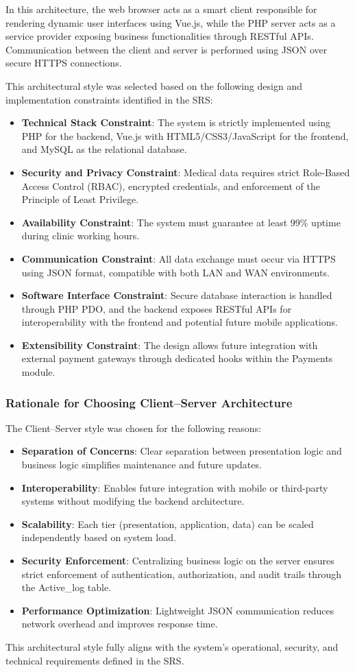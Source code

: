 In this architecture, the web browser acts as a smart client responsible for rendering dynamic user interfaces using Vue.js, while the PHP server acts as a service provider exposing business functionalities through RESTful APIs. Communication between the client and server is performed using JSON over secure HTTPS connections.

This architectural style was selected based on the following design and implementation constraints identified in the SRS:

\begin{itemize}
	\item \textbf{Technical Stack Constraint}: The system is strictly implemented using PHP for the backend, Vue.js with HTML5/CSS3/JavaScript for the frontend, and MySQL as the relational database.
	\item \textbf{Security and Privacy Constraint}: Medical data requires strict Role-Based Access Control (RBAC), encrypted credentials, and enforcement of the Principle of Least Privilege.
	\item \textbf{Availability Constraint}: The system must guarantee at least 99\% uptime during clinic working hours.
	\item \textbf{Communication Constraint}: All data exchange must occur via HTTPS using JSON format, compatible with both LAN and WAN environments.
	\item \textbf{Software Interface Constraint}: Secure database interaction is handled through PHP PDO, and the backend exposes RESTful APIs for interoperability with the frontend and potential future mobile applications.
	\item \textbf{Extensibility Constraint}: The design allows future integration with external payment gateways through dedicated hooks within the Payments module.
\end{itemize}

\subsubsection{Rationale for Choosing Client–Server Architecture}
The Client–Server style was chosen for the following reasons:

\begin{itemize}
	\item \textbf{Separation of Concerns}: Clear separation between presentation logic and business logic simplifies maintenance and future updates.
	\item \textbf{Interoperability}: Enables future integration with mobile or third-party systems without modifying the backend architecture.
	\item \textbf{Scalability}: Each tier (presentation, application, data) can be scaled independently based on system load.
	\item \textbf{Security Enforcement}: Centralizing business logic on the server ensures strict enforcement of authentication, authorization, and audit trails through the Active\_log table.
	\item \textbf{Performance Optimization}: Lightweight JSON communication reduces network overhead and improves response time.
\end{itemize}

This architectural style fully aligns with the system's operational, security, and technical requirements defined in the SRS.
\newpage
